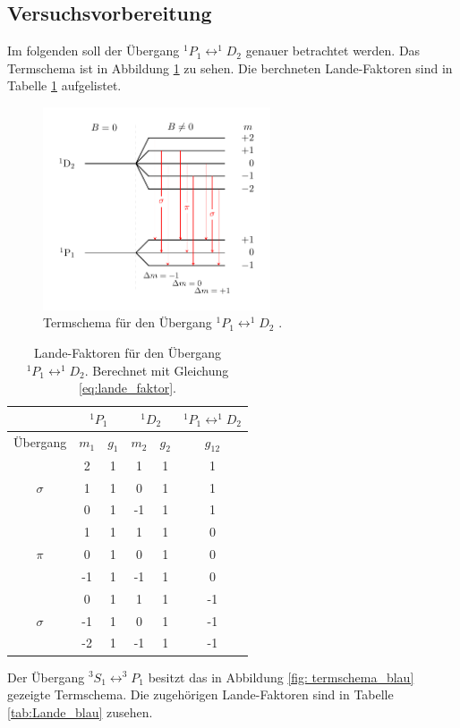 \subsection{Versuchsvorbereitung}

Im folgenden soll der Übergang  $^1P_1\leftrightarrow ^1\!\!D_2$ genauer betrachtet werden.
Das Termschema ist in Abbildung \ref{fig: termschema_rot} zu sehen. Die berchneten Lande-Faktoren
sind in Tabelle \ref{tab:Lande_rot} aufgelistet.

\FloatBarrier
\begin{figure}[h]
  \centering
  \includegraphics[width=0.6\textwidth]{pics/termschema_rot.pdf}
  \caption{Termschema für den Übergang $^1P_1\leftrightarrow ^1\!\!D_2$ \cite{luckyjosh}.}
  \label{fig: termschema_rot}
\end{figure}
\FloatBarrier
\FloatBarrier
\begin{table}
	\centering
  \caption{Lande-Faktoren für den Übergang $^1P_1\leftrightarrow ^1\!\!D_2$.  Berechnet mit Gleichung \eqref{eq:lande_faktor}.}
	\label{tab:Lande_rot}
	\begin{tabular}{cccccc}
		\toprule
		{} & \multicolumn{2}{c}{${}^1P_1$}  & \multicolumn{2}{c}{${}^1D_2$}  & $^1P_1\leftrightarrow ^1\!\!D_2$ \\
		\midrule
		 Übergang &   $m_1$  & $g_{1}$ & $m_2$ & $ g_2$  & $g_{12}$  \\
		\midrule
		& 2 & 1 & 1 & 1 & 1\\
		$\sigma$& 1 & 1 & 0 & 1 & 1\\
		& 0 & 1 & -1 & 1 & 1\\
		\midrule
		& 1 & 1 & 1 & 1 & 0\\
		$\pi$ & 0 & 1 & 0 & 1 & 0\\
		& -1 & 1 & -1 & 1 & 0\\
		\midrule
		& 0 & 1 & 1 & 1 & -1\\
		$\sigma$ & -1 & 1 & 0 & 1 & -1\\
		& -2 & 1 & -1 & 1 & -1\\\bottomrule
	\end{tabular}

\end{table}
\FloatBarrier
Der Übergang $^3S_1\leftrightarrow ^3\!\!P_1$ besitzt das in Abbildung \ref{fig: termschema_blau} gezeigte
Termschema. Die zugehörigen Lande-Faktoren sind in Tabelle \ref{tab:Lande_blau} zusehen.


